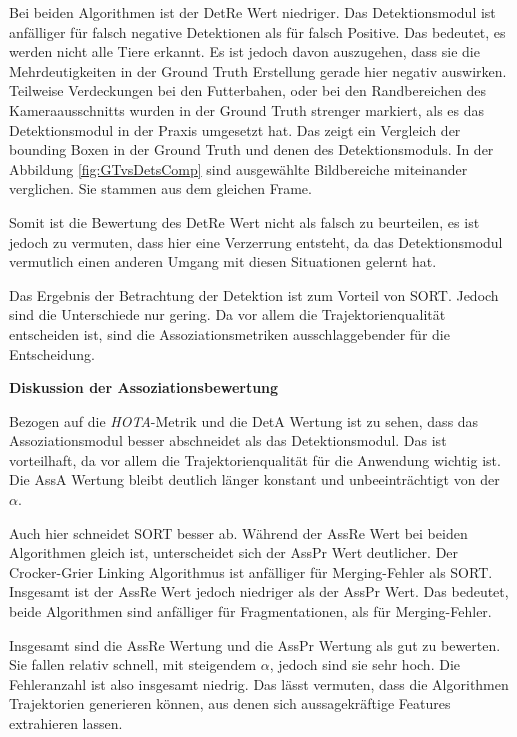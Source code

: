 Bei beiden Algorithmen ist der DetRe Wert niedriger. Das Detektionsmodul ist anfälliger für falsch negative Detektionen als für falsch Positive. Das bedeutet, es werden nicht alle Tiere erkannt. Es ist jedoch davon auszugehen, dass sie die Mehrdeutigkeiten in der Ground Truth Erstellung gerade hier negativ auswirken. Teilweise Verdeckungen bei den Futterbahen, oder bei den Randbereichen des Kameraausschnitts wurden in der Ground Truth strenger markiert, als es das Detektionsmodul in der Praxis umgesetzt hat. Das zeigt ein Vergleich der bounding Boxen in der Ground Truth und denen des Detektionsmoduls. In der Abbildung \ref{fig:GTvsDetsComp} sind ausgewählte Bildbereiche miteinander verglichen. Sie stammen aus dem gleichen Frame. \par

Somit ist die Bewertung des DetRe Wert nicht als falsch zu beurteilen, es ist jedoch zu vermuten, dass hier eine Verzerrung entsteht, da das Detektionsmodul vermutlich einen anderen Umgang mit diesen Situationen gelernt hat.\par

Das Ergebnis der Betrachtung der Detektion ist zum Vorteil von SORT. Jedoch sind die Unterschiede nur gering. Da vor allem die Trajektorienqualität entscheiden ist, sind die Assoziationsmetriken ausschlaggebender für die Entscheidung.\dubpar


\textbf{Diskussion der Assoziationsbewertung}\par
Bezogen auf die \textit{HOTA}-Metrik und die DetA Wertung ist zu sehen, dass das Assoziationsmodul besser abschneidet als das Detektionsmodul. Das ist vorteilhaft, da vor allem die Trajektorienqualität für die Anwendung wichtig ist. Die AssA Wertung bleibt deutlich länger konstant und unbeeinträchtigt von der \(\alpha\). \par

Auch hier schneidet SORT besser ab. Während der AssRe Wert bei beiden Algorithmen gleich ist, unterscheidet sich der AssPr Wert deutlicher. Der  Crocker-Grier Linking Algorithmus ist anfälliger für Merging-Fehler als SORT. Insgesamt ist der AssRe Wert jedoch niedriger als der AssPr Wert. Das bedeutet, beide Algorithmen sind anfälliger für Fragmentationen, als für Merging-Fehler.\par

Insgesamt sind die AssRe Wertung und die AssPr Wertung als gut zu bewerten. Sie fallen relativ schnell, mit steigendem \(\alpha\), jedoch sind sie sehr hoch. Die Fehleranzahl ist also insgesamt niedrig. Das lässt vermuten, dass die Algorithmen Trajektorien generieren können, aus denen sich aussagekräftige Features extrahieren lassen.\dubpar

